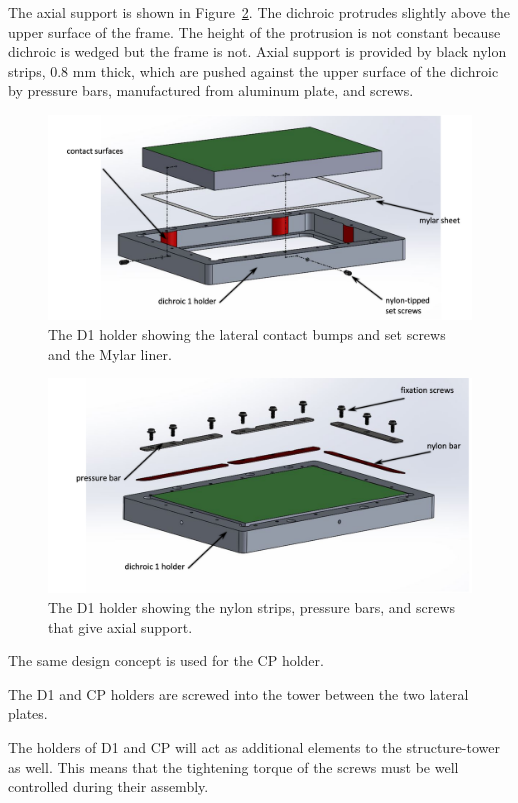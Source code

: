 \documentclass{report}
\begin{document}
The axial support is shown in Figure~\ref{figure:tower-d1-upper}.
The dichroic protrudes slightly above the upper surface of the frame. The height of the protrusion is not constant because dichroic is wedged but the frame is not. Axial support is provided by black nylon strips, 0.8 mm thick, which are pushed against the upper surface of the dichroic by pressure bars, manufactured from aluminum plate, and screws.


\begin{figure}
\begin{center}
\includegraphics[width=0.7\linewidth]{figures/tower-d1-lower.png}
\end{center}
\caption{The D1 holder showing the lateral contact bumps and set screws and the Mylar liner.}
\label{figure:tower-d1-lower}
\end{figure}


\begin{figure}
\begin{center}
\includegraphics[width=0.7\linewidth]{figures/tower-d1-upper.png}
\end{center}
\caption{The D1 holder showing the nylon strips, pressure bars, and screws that give axial support.}
\label{figure:tower-d1-upper}
\end{figure}


The same design concept is used for the CP holder.

The D1 and CP holders are screwed into the tower between the two lateral plates.

The holders of D1 and CP will act as additional elements to the structure-tower as well. This means that the tightening torque of the screws must be well controlled during their assembly.
\end{document}
